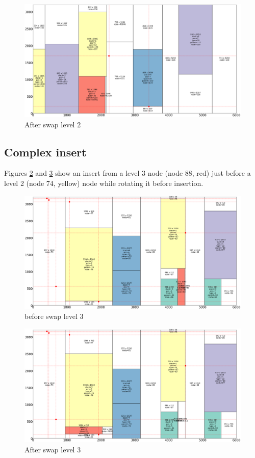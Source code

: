 \documentclass{roadef}
\begin{document}
        \begin{figure}
            \centering
            \includegraphics[width=0.7\linewidth]{swap_2_after.png}
            \caption{After swap level 2} \label{fig:swap2-after}
        \end{figure}

    \subsection{Complex insert}

        Figures \ref{fig:swap3-before} and \ref{fig:swap3-after} show an insert from a level 3 node (node 88, red) just before a level 2 (node 74, yellow) node while rotating it before insertion.

        \begin{figure}
            \centering
            \includegraphics[width=0.7\linewidth]{swap_3_rot_before.png}
            \caption{before swap level 3} \label{fig:swap3-before}
        \end{figure}

        \begin{figure}
            \centering
            \includegraphics[width=0.7\linewidth]{swap_3_rot_after.png}
            \caption{After swap level 3} \label{fig:swap3-after}
        \end{figure}
\end{document}
